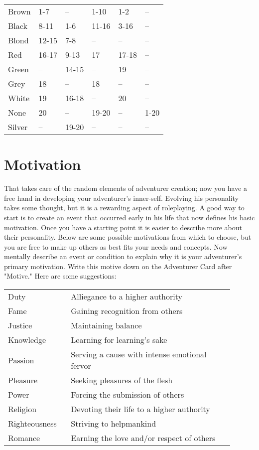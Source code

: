 \begin{multicols*}{2}
\begin{tcolorbox}[breakable,boxrule=0pt,after skip=0pt,before skip=5pt]
\begin{tabular}{l l l l l l}
Brown & 1-7 & -- & 1-10 & 1-2 & --\\
Black & 8-11 & 1-6 & 11-16 & 3-16 & --\\
Blond & 12-15 & 7-8 & -- & -- & --\\
Red & 16-17 & 9-13 & 17 & 17-18 & --\\
Green & -- & 14-15 & -- & 19 & --\\
Grey & 18 & -- & 18 & -- & --\\
White & 19 & 16-18 & -- & 20 & --\\
None & 20 & -- & 19-20 & -- & 1-20\\
Silver & -- & 19-20 & -- & -- & --
\end{tabular}
\end{tcolorbox}
\section{Motivation}
That takes care of the random elements of adventurer creation; now you have a free hand in developing your adventurer’s inner-self. Evolving his personality takes some thought, but it is a rewarding aspect of roleplaying. A good way to start is to create an event that occurred early in his life that now defines his basic motivation. Once you have a starting point it is easier to describe more about their personality.
Below are some possible motivations from which to choose, but you are free to make up others as best fits your needs and concepts. Now mentally describe an event or condition to explain why it is your adventurer's primary motivation. Write this motive down on the Adventurer Card after "Motive." Here are some suggestions:

\begin{tabular}{@{}p{0.25\linewidth} p{0.65\linewidth}}
Duty & Alliegance to a higher authority\\
Fame & Gaining recognition from others\\
Justice & Maintaining balance\\
Knowledge & Learning for learning’s sake\\
Passion & Serving a cause with intense emotional fervor\\
Pleasure & Seeking pleasures of the flesh\\
Power & Forcing the submission of others\\
Religion & Devoting their life to a higher authority\\
Righteousness & Striving to helpmankind\\
Romance & Earning the love and/or respect of others
\end{tabular}


\end{multicols*}
